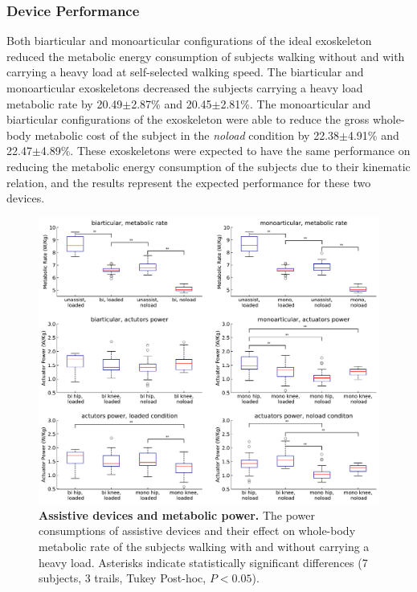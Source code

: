 \documentclass[10pt,letterpaper]{article}
\begin{document}
\subsubsection*{Device Performance}
Both biarticular and monoarticular configurations of the ideal exoskeleton reduced the metabolic energy consumption of subjects walking without and with carrying a heavy load at self-selected walking speed. The biarticular and monoarticular exoskeletons decreased the subjects carrying a heavy load metabolic rate by 20.49$\pm$2.87\% and 20.45$\pm$2.81\%. The monoarticular and biarticular configurations of the exoskeleton were able to reduce the gross whole-body metabolic cost of the subject in the \textit{noload} condition by 22.38$\pm$4.91\% and 22.47$\pm$4.89\%. These exoskeletons were expected to have the same performance on reducing the metabolic energy consumption of the subjects due to their kinematic relation, and the results represent the expected performance for these two devices.\\
\begin{figure}[ht]   
	\centering
	\includegraphics[width=\linewidth]{Ideal_Exo_MonovsBi_Figures/Paper_Figure_Energy_BoxPlot.pdf}
	\vspace{1mm}
	\caption{\small{\textbf{Assistive devices and metabolic power.} The power consumptions of assistive devices and their effect on whole-body metabolic rate of the subjects walking with and without carrying a heavy load. Asterisks indicate statistically significant differences (7 subjects, 3 trails, Tukey Post-hoc, $P < 0.05$).}}
	\label{Fig_IdealExo_Energy_BoxPlot}
\end{figure}
\end{document}
